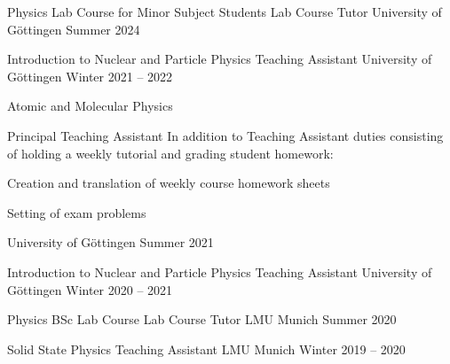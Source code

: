 


\begin{cvhonors}

  \cvhonor
    {Physics Lab Course for Minor Subject Students} %
    {Lab Course Tutor} %
    {University of G\"ottingen} %
    {Summer 2024} %

  \cvhonor
    {Introduction to Nuclear and Particle Physics} %
    {Teaching Assistant} %
    {University of G\"ottingen} %
    {Winter 2021 -- 2022} %

  \cvhonor
    {Atomic and Molecular Physics} %
    {%
      Principal Teaching Assistant\newline
      In addition to Teaching Assistant duties consisting of holding a weekly tutorial and grading student homework:\newline~
      \begin{cvitems}
        \item {Creation and translation of weekly course homework sheets}
        \item {Setting of exam problems}
      \end{cvitems}
    } %
    {University of G\"ottingen} %
    {Summer 2021} %

  \cvhonor
    {Introduction to Nuclear and Particle Physics} %
    {Teaching Assistant} %
    {University of G\"ottingen} %
    {Winter 2020 -- 2021} %

  \cvhonor
    {Physics BSc Lab Course} %
    {Lab Course Tutor} %
    {LMU Munich} %
    {Summer 2020} %

  \cvhonor
    {Solid State Physics} %
    {Teaching Assistant} %
    {LMU Munich} %
    {Winter 2019 -- 2020} %

\end{cvhonors}
